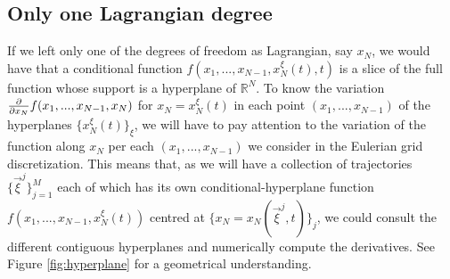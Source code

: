 \documentclass[11pt, a4paper]{article} %
\newcommand{\R}{\mathbb{R}} %
\begin{document}
\subsection*{Only one Lagrangian degree}
If we left only one of the degrees of freedom as Lagrangian, say $x_N$, we would have that a conditional function $f(x_1,...,x_{N-1},x_N^\xi(t),t)$ is a slice of the full function whose support is a hyperplane of $\R^N$. To know the variation $\pdv{}{x_N}f(x_1,...,x_{N-1},x_N)$ for $x_N=x_N^\xi(t)$ in each point $(x_1,...,x_{N-1})$ of the hyperplanes $\{x_N^\xi(t)\}_\xi$, we will have to pay attention to the variation of the function along $x_N$ per each $(x_1,...,x_{N-1})$ we consider in the Eulerian grid discretization. This means that, as we will have a collection of trajectories $\{\vec{\xi}^j\}_{j=1}^M$ each of which has its own conditional-hyperplane function $f(x_1,...,x_{N-1},x_N^\xi(t))$ centred at $\{x_N=x_N(\vec{\xi}^j,t)\}_j$, we could consult the different contiguous hyperplanes and numerically compute the derivatives. See Figure \ref{fig:hyperplane} for a geometrical understanding.
\end{document}
